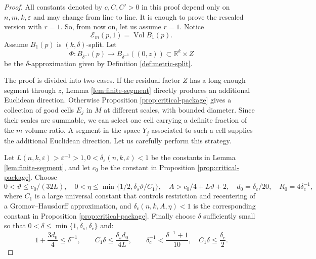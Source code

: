 \documentclass[11pt]{amsart}
\theoremstyle{definition}
\theoremstyle{remark}
\DeclareMathOperator{\Vol}{Vol}
\newcommand{\Ex}{\mathcal E}
\begin{document}
\begin{proof}
All constants denoted by $c,C,C'>0$ in this proof depend only on
$n,m,k,\varepsilon$ and may change from line to line. It is enough to prove the rescaled version with
$r=1$. So, from now on, let us assume $r=1$.
Notice
\[
                         \Ex_m(p,1)=\Vol B_1(p).
\]
Assume $B_{1}(p)$ is $(k,\delta)$-split. Let
\begin{equation}\label{eqn:Original}
 \Phi:B_{\delta^{-1}}(p)\longrightarrow
 B_{\delta^{-1}}((0,z))\subset\mathbb R^k\times Z
\end{equation}
be the $\delta$-approximation given by  Definition \ref{def:metric-split}.
\smallskip

The proof is divided into two cases. If the residual factor $Z$ has a long enough segment through $z$, Lemma \ref{lem:finite-segment} directly produces an additional Euclidean direction. Otherwise Proposition
\ref{prop:critical-package} gives a collection of
good cells $E_j$ in $M$ at different scales, with bounded diameter.  Since their scales are summable, we can select one cell carrying a
definite fraction of the $m$-volume ratio. A segment in the space $Y_j$ associated to such a cell supplies the additional Euclidean direction. Let us carefully perform this strategy.
\smallskip

Let $L(n,k,\varepsilon)>\varepsilon^{-1}>1,0<\delta_s(n,k,\varepsilon)<1$ be the constants in Lemma \ref{lem:finite-segment}, and let $c_0$ be the constant in Proposition \ref{prop:critical-package}. Choose
\[
 0<\vartheta\le c_0/(32L),\quad
 0<\eta\le\min\{1/2,\delta_s\vartheta/C_1\},\quad
 A>c_0/4+L\vartheta+2,\quad
 d_0=\delta_c/20,\quad R_0=4\delta_c^{-1},
\]
where $C_{1}$ is a large universal constant that controls restriction and recentering of a
Gromov--Hausdorff approximation, and $\delta_c(n,k,A,\eta)<1$ is the corresponding constant in
Proposition \ref{prop:critical-package}. Finally choose $\delta$ sufficiently
small so that $0<\delta\leq \min\{1,\delta_s,\delta_c\}$ and:
\begin{equation}\label{eqn:ChoiceOfDelta}
    1+\frac{3d_0}{4}\leq \delta^{-1}, \qquad C_1\delta\leq \frac{\delta_s d_0}{4L}, \qquad \delta_c^{-1}<\frac{\delta^{-1}+1}{10}, \quad C_1\delta\leq \frac{\delta_c}{2}.
\end{equation}


\end{proof}
\end{document}
